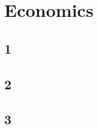 \section{Economics}
\subsection{1}
\label{subsec:ecos_1}
\subsection{2}
\label{subsec:ecos_2}
\subsection{3}
\label{subsec:ecos_3}

